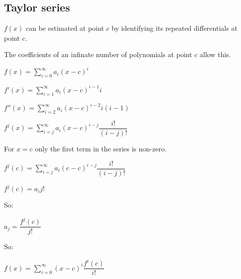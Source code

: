 
\subsection{Taylor series}


\(f(x)\) can be estimated at point \(c\) by identifying its repeated differentials at point \(c\).

The coefficients of an infinate number of polynomials at point \(c\) allow this.

\(f(x)=\sum_{i=0}^{\infty }a_i(x-c)^i\)

\(f'(x)=\sum_{i=1}^{\infty }a_i(x-c)^{i-1}i\)

\(f''(x)=\sum_{i=2}^{\infty }a_i(x-c)^{i-2}i(i-1)\)

\(f^j(x)=\sum_{i=j}^{\infty }a_i(x-c)^{i-j}\dfrac{i!}{(i-j)!}\)

For \(x=c\) only the first term in the series is non-zero.

\(f^j(c)=\sum_{i=j}^{\infty }a_i(c-c)^{i-j}\dfrac{i!}{(i-j)!}\)

\(f^j(c)=a_ij!\)

So:

\(a_j=\dfrac{f^j(c)}{j!}\)

So:

\(f(x)=\sum_{i=0}^\infty (x-c)^i \dfrac{f^i(c)}{i!}\)

